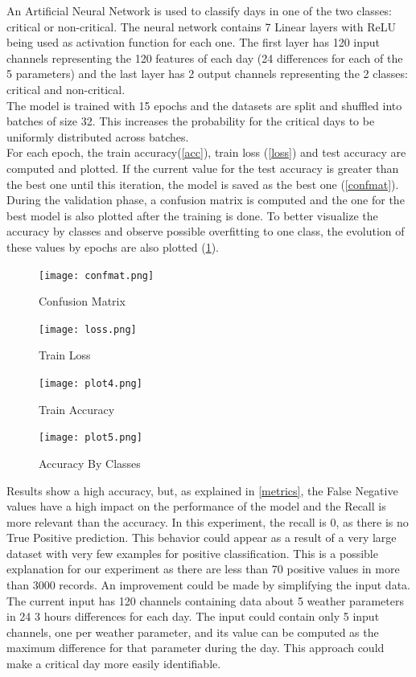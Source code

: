\documentclass{article}
\begin{document}
An Artificial Neural Network is used to classify days in one of the two classes: critical or non-critical. The neural network contains 7 Linear layers with ReLU being used as activation function for each one. The first layer has 120 input channels representing the 120 features of each day (24 differences for each of the 5 parameters) and the last layer has 2 output channels representing the 2 classes: critical and non-critical.
\\

The model is trained with 15 epochs and the datasets are split and shuffled into batches of size 32. This increases the probability for the critical days to be uniformly distributed across batches. 
\\

For each epoch, the train accuracy(\ref{acc}), train loss (\ref{loss}) and test accuracy are computed and plotted. If the current value for the test accuracy is greater than the best one until this iteration, the model is saved as the best one (\ref{confmat}). During the validation phase, a confusion matrix is computed and the one for the best model is also plotted after the training is done. To better visualize the accuracy by classes and observe possible overfitting to one class, the evolution of these values by epochs are also plotted
(\ref{accCl}).
\\

\begin{figure}[h!] 
\begin{multicols}{2}

\centering
\texttt{[image: confmat.png]}
\caption{Confusion Matrix} 
\label{confmat}

\centering
\texttt{[image: loss.png]}
\caption{Train Loss} 
\label{loss}

\centering
\texttt{[image: plot4.png]}
\caption{Train Accuracy} 
\label{acc}

\centering
\texttt{[image: plot5.png]}
\caption{Accuracy By Classes} 
\label{accCl}
\end{multicols}
\end{figure}


Results show a high accuracy, but, as explained in \ref{metrics}, the False Negative values have a high impact on the performance of the model and the Recall is more relevant than the accuracy. In this experiment, the recall is 0, as there is no True Positive prediction. This behavior could appear as a result of a very large dataset with very few examples for positive classification. This is a possible explanation for our experiment as there are less than 70 positive values in more than 3000 records. An improvement could be made by simplifying the input data. The current input has 120 channels containing data about 5 weather parameters in 24 3 hours differences for each day. The input could contain only 5 input channels, one per weather parameter, and its value can be computed as the maximum difference for that parameter during the day. This approach could make a critical day more easily identifiable.
\end{document}
